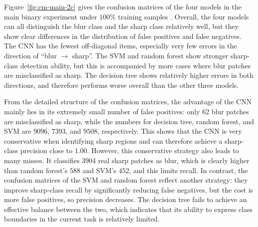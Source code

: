 \par Figure~\ref{fig:cm-main-2c} gives the confusion matrices of the four
models in the main binary experiment under $100\%$ training samples
\cite{schutze2008introduction}. Overall, the four models can all distinguish
the blur class and the sharp class relatively well, but they show clear
differences in the distribution of false positives and false negatives. The CNN
has the fewest off-diagonal items, especially very few errors in the direction
of ``blur $\rightarrow$ sharp''. The SVM and random forest show stronger
sharp-class detection ability, but this is accompanied by more cases where blur
patches are misclassified as sharp. The decision tree shows relatively higher
errors in both directions, and therefore performs worse overall than the other
three models.

\par From the detailed structure of the confusion matrices, the advantage of the
CNN mainly lies in its extremely small number of false positives: only $62$
blur patches are misclassified as sharp, while the numbers for decision tree,
random forest, and SVM are $9096$, $7393$, and $9508$, respectively. This
shows that the CNN is very conservative when identifying sharp regions and can
therefore achieve a sharp-class precision close to $1.00$. However, this
conservative strategy also leads to many misses. It classifies $3904$ real
sharp patches as blur, which is clearly higher than random forest's $588$ and
SVM's $452$, and this limits recall. In contrast, the confusion matrices of
the SVM and random forest reflect another strategy: they improve sharp-class
recall by significantly reducing false negatives, but the cost is more false
positives, so precision decreases. The decision tree fails to achieve an
effective balance between the two, which indicates that its ability to express
class boundaries in the current task is relatively limited.

